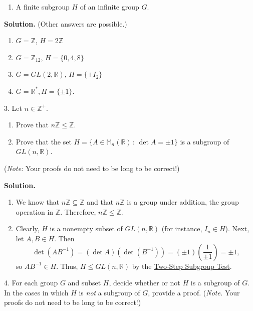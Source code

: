 \documentclass[10pt,]{book}
\theoremstyle{plain}
\theoremstyle{definition}
\theoremstyle{definition}
\theoremstyle{definition}
\theoremstyle{definition}
\numberwithin{equation}{section}
\def\Z{\mathbb{Z}}
\def\R{\mathbb{R}}
\def\M{\mathbb{M}}
\begin{document}
\begin{exerciselist}
\begin{enumerate}[label=(\alph*)]
\item\hypertarget{li-223}{}A finite subgroup \(H\) of an infinite group \(G\).%
\end{enumerate}
%
\par\smallskip
\par\smallskip
\noindent\textbf{Solution.}\hypertarget{solution-29}{}\quad
(Other answers are possible.) \leavevmode%
\begin{enumerate}[label=(\alph*)]
\item\hypertarget{li-224}{}\(G=\Z\), \(H=2\Z\)%
\item\hypertarget{li-225}{}\(G=\Z_{12}\), \(H=\{0,4,8\}\)%
\item\hypertarget{li-226}{}\(G=GL(2,\R)\), \(H=\{\pm I_2\}\)%
\item\hypertarget{li-227}{}\(G=\R^*, H=\{\pm 1\}\).%
\end{enumerate}
%
\item[3.]\hypertarget{exercise-30}{}Let \(n\in \Z^+\). \leavevmode%
\begin{enumerate}[label=(\alph*)]
\item\hypertarget{li-228}{}Prove that \(n\Z \leq \Z\).%
\item\hypertarget{li-229}{}Prove that the set \(H=\{A\in \M_n(\R)\,:\,\det A=\pm 1\}\) is a subgroup of \(GL(n,\R)\).%
\end{enumerate}
%
\par
(\emph{Note:} Your proofs do not need to be long to be correct!)%
\par\smallskip
\par\smallskip
\noindent\textbf{Solution.}\hypertarget{solution-30}{}\quad
\leavevmode%
\begin{enumerate}[label=(\alph*)]
\item\hypertarget{li-230}{}We know that \(n\Z\subseteq \Z\) and that \(n\Z\) is a group under addition, the group operation in \(\Z\).  Therefore, \(n\Z\leq \Z\).%
\item\hypertarget{li-231}{}Clearly, \(H\) is a nonempty subset of \(GL(n,\R)\) (for instance, \(I_n\in H\)).  Next, let \(A,B\in H\). Then%
\begin{equation*}
\det(AB^{-1})=(\det A)(\det (B^{-1}))=(\pm 1)\left(\frac{1}{\pm 1}\right)=\pm 1,
\end{equation*}
so \(AB^{-1}\in H\).  Thus, \(H\leq GL(n,\R)\) by the \hyperref[twostep]{Two-Step Subgroup Test}.%
\end{enumerate}
\item[4.]\hypertarget{exercise-31}{}For each group \(G\) and subset \(H\), decide whether or not \(H\) is a subgroup of \(G\). In the cases in which \(H\) is \emph{not} a subgroup of \(G\), provide a proof. (\emph{Note.} Your proofs do not need to be long to be correct!) \leavevmode%

\end{exerciselist}
\end{document}
